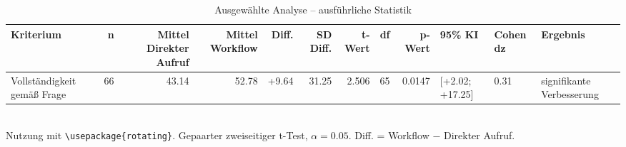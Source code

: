 \begin{table}
\centering
\caption{Ausgewählte Analyse -- ausführliche Statistik}
\begin{tabular}{lrrrrrrrrlll}
\toprule
Kriterium & n & Mittel Direkter Aufruf & Mittel Workflow & Diff. & SD Diff. & t-Wert & df & p-Wert & 95\% KI & Cohen dz & Ergebnis \\
\midrule
Vollständigkeit gemäß Frage & 66 & 43.14 & 52.78 & +9.64 & 31.25 & 2.506 & 65 & 0.0147 & [+2.02; +17.25] & 0.31 & signifikante Verbesserung \\
\bottomrule
\end{tabular}
\\[2mm]
\footnotesize Nutzung mit \texttt{\textbackslash usepackage\{rotating\}}. Gepaarter zweiseitiger t-Test, $\alpha=0.05$. Diff. = Workflow $-$ Direkter Aufruf.
\end{table}
